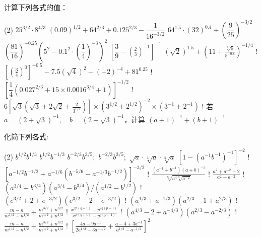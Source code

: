 \begin{Exercise}
\begin{question}
  \item 计算下列各式的值：
  \begin{tasks}(2)
    \task  $25^{3 / 2} \cdot 8^{4 / 3}$ 
    \task  $(0.09)^{1 / 2}+64^{2 / 3}+0.125^{2 / 3}-\dfrac{1}{16^{-3/2}}$
    \task  $64^{1.5} \cdot(32)^{0.4} \div\left(\dfrac{9}{25}\right)^{-3/2}$
    \task  $\left(\dfrac{81}{16}\right)^{-0.25}\left(5^{2}-0.1^{2} \cdot\left(\dfrac{1}{4}\right)^{-3}\right)^{2}$
    \task  $\left[\dfrac{3}{9}-\left(\frac{2}{3}\right)^{-1}\right]^{-1}$
    \task  $(\sqrt{2})^{1.5}+\left(11+\frac{\sqrt[5]{5}}{5^{-0.8}}\right)^{-1 / 4}$
    \task!  $\left[\left(\frac{3}{4}\right)^{0}\right]^{-0.5}-7.5(\sqrt{4})^{2}-(-2)^{-4}+81^{0.25}$
    \task!  $\left[\dfrac{1}{4}\left(0.027^{2 / 3}+15 \times 0.0016^{3 / 4}+1\right)\right]^{-1 / 2}$
    \task!  $6\left[\sqrt{3}\left(\sqrt{3}+2 \sqrt{2}+\frac{2}{3^{1 / 2}}\right)\right] \times\left(3^{1 / 2}+2^{1 / 2}\right)^{-2} \times\left(3^{-1}+2^{-1}\right)$
    \task!  若 $a=(2+\sqrt{3})^{-1},\quad  b=(2-\sqrt{3})^{-1}$，计算 $(a+1)^{-1}+(b+1)^{-1}$
  \end{tasks}
  \item  化简下列各式:
  \begin{tasks}(2)
    \task   $b^{1 / 2} b^{1 / 3}$
    \task   $b^{1 / 2} b^{-1 / 3}$
    \task   $b^{-2 / 3} b^{3 / 5} ;$
    \task   $b^{-2 / 3} b^{3 / 5} ;$
    \task   $\sqrt{a} \cdot \sqrt[3]{a} \cdot \sqrt[5]{a}$
    \task   $\left[1-\left(a^{-1} b^{-1}\right)^{-1}\right]^{-2}$
    \task!  $\left[a^{-1 / 2} b^{-1 / 2}+a^{-1 / 6}\left(b^{-5 / 6}-a^{-1 / 3} b^{-1 / 2}\right)\right]^{-3 / 2}$
    \task!  $\frac{\left(a^{-1}+b^{-1}\right)(a+b)^{-1}}{\sqrt[6]{a^{4} \sqrt[5]{a^{-2}}}}$
    \task!  $\frac{a^{2}+a^{-2}-2}{a^{2}-a^{-2}}$
    \task!  $\left(a^{3 / 4}+b^{3 / 4}\right)\left(a^{3 / 4}-b^{3 / 4}\right) /\left(a^{1 / 2}-b^{1 / 2}\right)$
    \task!  $\left(e^{3 / 2}+2+e^{-3 / 2}\right)\left(e^{3 / 2}-2+e^{-3 / 2}\right)$
    \task!  $\left(a^{1 / 3}+a^{-1 / 3}\right)\left(a^{2 / 3}-1+a^{2 / 3}\right)$
    \task!  $\frac{m-n}{m^{1 / 2}-n^{1 / 2}}+\frac{m^{3 / 2}+n^{3/2}}{m^{1 / 2}+n^{1 / 2}}$
    \task!  $\frac{x^{2 p(q+1)}-y^{2 q(p-1)}}{x^{p(q+1)}-y^{q(p-1)}}$
    \task!  $\left(a^{4 / 3}-2+a^{-4 / 3}\right)\left(a^{2 / 3}-a^{-2 / 3}\right)$
    \task!  $\frac{m-n}{m^{1 / 2}-n^{1 / 2}}+\frac{m^{3 / 2}+n^{3/2}}{m^{1 / 2}+n^{1 / 2}}$
    \task!  $\left[\frac{4 a-9 a^{-1}}{2 a^{1 / 2}-3 a^{-1 / 2}}+\frac{a-4+3 a^{-1}}{a^{1 / 2}-a^{-1 / 2}}\right]^{2}$

\end{tasks}
\end{question}
\end{Exercise}
